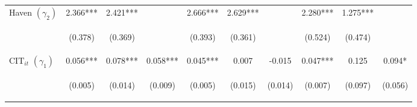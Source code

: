 \begin{center}
\begin{tabular}{lccccccccc}
Haven $(\gamma_2)$ & 2.366*** & 2.421*** &  & 2.666*** & 2.629*** &  & 2.280*** & 1.275*** &  \\
\vspace{4pt} & \begin{footnotesize}(0.378)\end{footnotesize} & \begin{footnotesize}(0.369)\end{footnotesize} & \begin{footnotesize}\end{footnotesize} & \begin{footnotesize}(0.393)\end{footnotesize} & \begin{footnotesize}(0.361)\end{footnotesize} & \begin{footnotesize}\end{footnotesize} & \begin{footnotesize}(0.524)\end{footnotesize} & \begin{footnotesize}(0.474)\end{footnotesize} & \begin{footnotesize}\end{footnotesize} \\
$ \text{CIT}_{it}$ $(\gamma_1)$ & 0.056*** & 0.078*** & 0.058*** & 0.045*** & 0.007 & -0.015 & 0.047*** & 0.125 & 0.094* \\
\vspace{4pt} & \begin{footnotesize}(0.005)\end{footnotesize} & \begin{footnotesize}(0.014)\end{footnotesize} & \begin{footnotesize}(0.009)\end{footnotesize} & \begin{footnotesize}(0.005)\end{footnotesize} & \begin{footnotesize}(0.015)\end{footnotesize} & \begin{footnotesize}(0.014)\end{footnotesize} & \begin{footnotesize}(0.007)\end{footnotesize} & \begin{footnotesize}(0.097)\end{footnotesize} & \begin{footnotesize}(0.056)\end{footnotesize} \\

\end{tabular}
\end{center}
